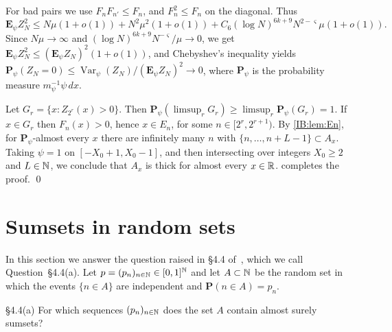 For bad pairs we use $F_nF_{n'}\le F_n$, and $F_n^2\le F_n$ on the diagonal. Thus
\[
\mathbf E_\psi Z_N^2\le N\mu(1+o(1))+N^2\mu^2(1+o(1))+C_6(\log N)^{6k+9}N^{2-\varsigma}\mu(1+o(1)).
\]
Since $N\mu\to\infty$ and $(\log N)^{6k+9}N^{-\varsigma}/\mu\to0$, we get
$\mathbf E_\psi Z_N^2\le(\mathbf E_\psi Z_N)^2(1+o(1))$, and Chebyshev's inequality yields
$\mathbf P_\psi(Z_N=0)\le\operatorname{Var}_\psi(Z_N)/(\mathbf E_\psi Z_N)^2\to0$, where $\mathbf P_\psi$ is the
probability measure $m_\psi^{-1}\psi\,dx$.

Let $G_r=\{x:Z_{2^r}(x)>0\}$. Then $\mathbf P_\psi(\limsup_rG_r)\ge\limsup_r\mathbf P_\psi(G_r)=1$. If
$x\in G_r$ then $F_n(x)>0$, hence $x\in E_n$, for some $n\in[2^r,2^{r+1})$. By
\cref{IB:lem:En}, for $\mathbf P_\psi$-almost every $x$ there are infinitely many $n$ with
$\{n,\dots,n+L-1\}\subset A_x$. Taking $\psi=1$ on $[-X_0+1,X_0-1]$, and then intersecting
over integers $X_0\ge2$ and $L\in\mathbb{N}$, we conclude that $A_x$ is thick for almost every $x\in\mathbb{R}$.
 completes the proof. \qed


\section{Sumsets in random sets}
\label{IB:sec:u44a}

In this section we answer the question raised in \S4.4 of~\cite{kra2023problems},
which we call Question~\S4.4(a). Let $p=(p_n)_{n\in\mathbb{N}}\in[0,1]^{\mathbb{N}}$ and let $A\subset\mathbb{N}$ be the
random set in which the events $\{n\in A\}$ are independent and $\mathbf P(n\in A)=p_n$.

\begin{question}{\S4.4(a)}
\label{IB:q:44a}
For which sequences $(p_n)_{n\in\mathbb{N}}$ does the set $A$ contain almost surely sumsets?
\end{question}

